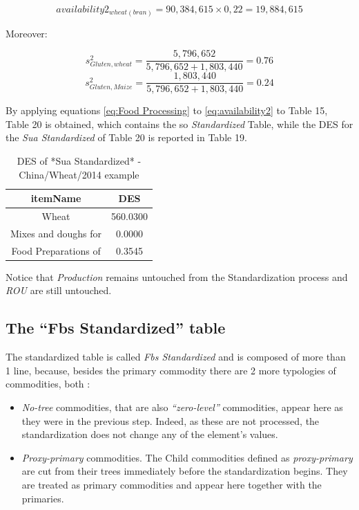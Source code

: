 \documentclass[]{article}
\providecommand{\tightlist}{%
  \setlength{\itemsep}{0pt}\setlength{\parskip}{0pt}}
\begin{document}
\begin{equation}
\label{eq:avExample2}
availability2_{wheat(bran)} = 90,384,615\times 0,22 = 19,884,615
\end{equation}

Moreover:

\begin{equation}
\label{eq:shareEx1}
s^{2}_{Gluten,wheat} = \frac{5,796,652}{5,796,652 + 1,803,440} = 0.76
\end{equation}\begin{equation}
\label{eq:shareEx1}
s^{2}_{Gluten,Maize} = \frac{1,803,440}{5,796,652 + 1,803,440} = 0.24
\end{equation}

By applying equations \ref{eq:Food Processing} to \ref{eq:availability2}
to Table 15, Table 20 is obtained, which contains the so
\emph{Standardized} Table, while the DES for the \emph{Sua Standardized}
of Table 20 is reported in Table 19.

\begin{table}

\caption{\label{tab:t20}DES of *Sua Standardized* - China/Wheat/2014 example}
\centering
\begin{tabular}[t]{c|c}
\hline
itemName & DES\\
\hline
Wheat & 560.0300\\
\hline
Mixes and doughs for & 0.0000\\
\hline
Food Preparations of & 0.3545\\
\hline
\end{tabular}
\end{table}

Notice that \emph{Production} remains untouched from the Standardization
process and \emph{ROU} are still untouched.

\subsection*{\texorpdfstring{The ``Fbs Standardized''
table}{The Fbs Standardized table}}\label{the-fbs-standardized-table}

The standardized table is called \emph{Fbs Standardized} and is composed
of more than 1 line, because, besides the primary commodity there are 2
more typologies of commodities, both :

\begin{itemize}
\tightlist
\item
  \emph{No-tree} commodities, that are also \emph{``zero-level''}
  commodities, appear here as they were in the previous step. Indeed, as
  these are not processed, the standardization does not change any of
  the element's values.
\item
  \emph{Proxy-primary} commodities. The Child commodities defined as
  \emph{proxy-primary} are cut from their trees immediately before the
  standardization begins. They are treated as primary commodities and
  appear here together with the primaries.
\end{itemize}
\end{document}
